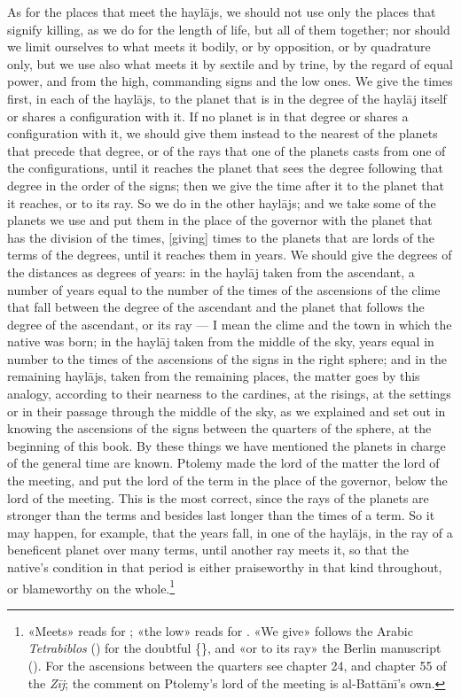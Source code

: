 \documentclass[11pt]{article}
\newcommand{\Fol}[1]{\marginpar{\footnotesize\color{gray}f.\,#1}}
\begin{document}
\par \Fol{77v}\Fol{78r}As for the places that meet the haylājs, we should not use only the places that signify killing, as we do for the length of life, but all of them together; nor should we limit ourselves to what meets it bodily, or by opposition, or by quadrature only, but we use also what meets it by sextile and by trine, by the regard of equal power, and from the high, commanding signs and the low ones. We give the times first, in each of the haylājs, to the planet that is in the degree of the haylāj itself or shares a configuration with it. If no planet is in that degree or shares a configuration with it, we should give them instead to the nearest of the planets that precede that degree, or of the rays that one of the planets casts from one of the configurations, until it reaches the planet that sees the degree following that degree in the order of the signs; then we give the time after it to the planet that it reaches, or to its ray. So we do in the other haylājs; and we take some of the planets we use and put them in the place of the governor with the planet that has the division of the times, [giving] times to the planets that are lords of the terms of the degrees, until it reaches them in years. We should give the degrees of the distances as degrees of years: in the haylāj taken from the ascendant, a number of years equal to the number of the times of the ascensions of the clime that fall between the degree of the ascendant and the planet that follows the degree of the ascendant, or its ray — I mean the clime and the town in which the native was born; in the haylāj taken from the middle of the sky, years equal in number to the times of the ascensions of the signs in the right sphere; and in the remaining haylājs, taken from the remaining places, the matter goes by this analogy, according to their nearness to the cardines, at the risings, at the settings or in their passage through the middle of the sky, as we explained and set out in knowing the ascensions of the signs between the quarters of the sphere, at the beginning of this book. By these things we have mentioned the planets in charge of the general time are known. Ptolemy made the lord of the matter the lord of the meeting, and put the lord of the term in the place of the governor, below the lord of the meeting. This is the most correct, since the rays of the planets are stronger than the terms and besides last longer than the times of a term. So it may happen, for example, that the years fall, in one of the haylājs, in the ray of a beneficent planet over many terms, until another ray meets it, so that the native's condition in that period is either praiseworthy in that kind throughout, or blameworthy on the whole.\footnote{«Meets» reads  for ; «the low» reads  for . «We give» follows the Arabic \emph{Tetrabiblos} () for the doubtful \{\}, and «or to its ray» the Berlin manuscript (). For the ascensions between the quarters see chapter 24, and chapter 55 of the \emph{Zīj}; the comment on Ptolemy's lord of the meeting is al-Battānī's own.}\par
\end{document}
